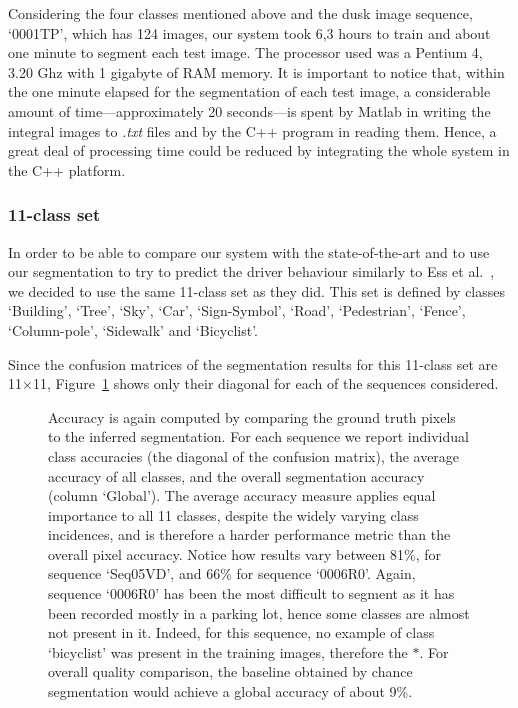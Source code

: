Considering the four classes mentioned above and the dusk image sequence, `0001TP', which has 124 images, our system took 6,3 hours to train and about one minute to segment each test image. The processor used was a Pentium 4, 3.20 Ghz with 1 gigabyte of RAM memory. It is important to notice that, within the one minute elapsed for the segmentation of each test image, a considerable amount of time---approximately 20 seconds---is spent by Matlab in writing the integral images to \emph{.txt} files and by the C++ program in reading them. Hence, a great deal of processing time could be reduced by integrating the whole system in the C++ platform.

\subsubsection{11-class set}

In order to be able to compare our system with the state-of-the-art and to use our segmentation to try to predict the driver behaviour similarly to Ess et al.~\cite{ess:traffic_segmentation}, we decided to use the same 11-class set as they did. This set is defined by classes `Building', `Tree', `Sky', `Car', `Sign-Symbol', `Road', `Pedestrian', `Fence', `Column-pole', `Sidewalk' and `Bicyclist'.

Since the confusion matrices of the segmentation results for this 11-class set are 11$\times$11, Figure~\ref{fig:results_matrix_11_c} shows only their diagonal for each of the sequences considered.

\begin{figure}[htb]
\caption[Results for 11-class set segmentation]{Accuracy is again computed by comparing the ground truth pixels to the inferred
segmentation. For each sequence we report individual class accuracies (the diagonal of the confusion matrix), the average accuracy of all classes, and the overall segmentation accuracy (column `Global'). The average accuracy measure applies equal importance to all
11 classes, despite the widely varying class incidences, and is therefore a harder performance metric than the overall pixel accuracy. Notice how results vary between 81\%, for sequence `Seq05VD', and 66\% for sequence `0006R0'. Again, sequence `0006R0' has been the most difficult to segment as it has been recorded mostly in a parking lot, hence some classes are almost not present in it. Indeed, for this sequence, no example of class `bicyclist' was present in the training images, therefore the $*$. For overall quality comparison, the baseline obtained by chance segmentation would achieve a global accuracy of about 9\%.}
\label{fig:results_matrix_11_c}
\end{figure}


